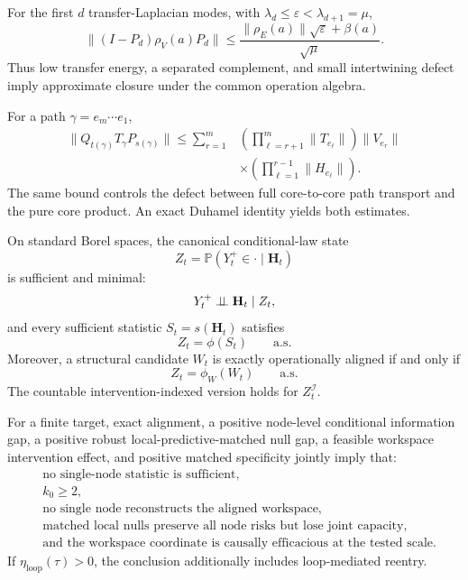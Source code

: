 

For the first \(d\) transfer-Laplacian modes, with
\(\lambda_d\leq\varepsilon<\lambda_{d+1}=\mu\),
\[
\boxed{
\|(I-P_d)\rho_V(a)P_d\|
\leq
\frac{\|\rho_E(a)\|\sqrt{\varepsilon}+\beta(a)}{\sqrt{\mu}}.
}
\]
Thus low transfer energy, a separated complement, and small intertwining defect
imply approximate closure under the common operation algebra.


For a path \(\gamma=e_m\cdots e_1\),
\[
\boxed{
\begin{aligned}
\|Q_{t(\gamma)}T_\gamma P_{s(\gamma)}\|
\leq
\sum_{r=1}^{m}
&\left(
\prod_{\ell=r+1}^{m}\|T_{e_\ell}\|
\right)
\|V_{e_r}\|\\
&\times
\left(
\prod_{\ell=1}^{r-1}\|H_{e_\ell}\|
\right).
\end{aligned}
}
\]
The same bound controls the defect between full core-to-core path transport and
the pure core product. An exact Duhamel
identity yields both estimates.


On standard Borel spaces, the canonical conditional-law state
\[
Z_t
=
\mathbb P(Y_t^+\in\cdot\mid\mathbf H_t)
\]
is sufficient and minimal:
\[
Y_t^+\perp\!\!\!\perp\mathbf H_t\mid Z_t,
\]
and every sufficient statistic \(S_t=s(\mathbf H_t)\) satisfies
\[
Z_t=\phi(S_t)
\qquad\text{a.s.}
\]
Moreover, a structural candidate \(W_t\) is exactly operationally aligned if
and only if
\[
Z_t=\phi_W(W_t)
\qquad\text{a.s.}
\]
The countable intervention-indexed version holds for
\(Z_t^{\mathcal I}\).


For a finite target, exact alignment, a positive node-level conditional
information gap, a positive robust local-predictive-matched null gap, a feasible
workspace intervention effect, and positive matched specificity jointly imply
that:
\[
\begin{aligned}
&\text{no single-node statistic is sufficient},\\
&k_0\geq2,\\
&\text{no single node reconstructs the aligned workspace},\\
&\text{matched local nulls preserve all node risks but lose joint capacity},\\
&\text{and the workspace coordinate is causally efficacious at the tested scale.}
\end{aligned}
\]
If \(\eta_{\mathrm{loop}}(\tau)>0\), the conclusion additionally includes
loop-mediated reentry.

